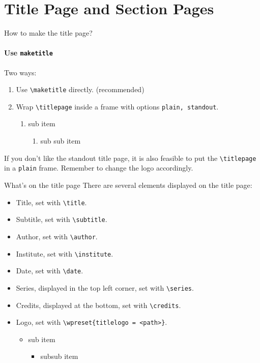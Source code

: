\documentclass[no-math, aspectratio=1610, 10pt]{beamer}
\begin{document}
    \section{Title Page and Section Pages}

    \begin{frame}[fragile]{How to make the title page?}
        \framesubtitle{Use \texttt{maketitle}}
        Two ways:
        \begin{enumerate}
            \item Use \verb|\maketitle| directly. (recommended)
            \item Wrap \verb|\titlepage| inside a frame with options \texttt{plain, standout}.
            \begin{enumerate}
                \item sub item
                \begin{enumerate}
                    \item sub sub item
                \end{enumerate}
            \end{enumerate}
        \end{enumerate}

        If you don't like the standout title page, it is also feasible to put the \verb|\titlepage| in a \texttt{plain} frame. Remember to change the logo accordingly.
    \end{frame}

    \begin{frame}[fragile]{What's on the title page}
        There are several elements displayed on the title page:
        \begin{itemize}
            \item Title, set with \verb|\title|.
            \item Subtitle, set with \verb|\subtitle|.
            \item Author, set with \verb|\author|.
            \item Institute, set with \verb|\institute|.
            \item Date, set with \verb|\date|.
            \item Series, displayed in the top left corner, set with \verb|\series|.
            \item Credits, displayed at the bottom, set with \verb|\credits|.
            \item Logo, set with \verb|\wpreset{titlelogo = <path>}|.
            \begin{itemize}
                \item sub item
                \begin{itemize}
                    \item subsub item
                \end{itemize}
            \end{itemize}
        \end{itemize}
    \end{frame}
\end{document}
